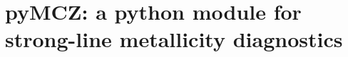 \documentclass{emulateapj}
\begin{document}






\section{pyMCZ: a python module for strong-line metallicity diagnostics}\label{sec:method_sec}
\end{document}
